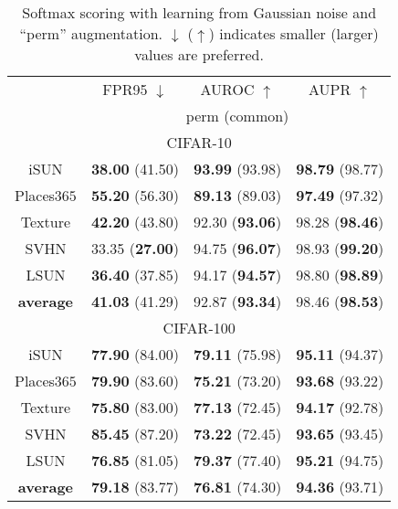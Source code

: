 \documentclass{article}
\begin{document}
\begin{table}[t]
\parbox{.47\linewidth}{
\centering
\caption{{Softmax scoring with learning from Gaussian noise and ``perm'' augmentation. $\downarrow$ ($\uparrow$) indicates smaller (larger) values are preferred.}} \label{tab: softmax perm}
\vspace{5pt}
\scriptsize
{
\begin{tabular}{c|ccc}
\toprule[1.5pt]
                   & FPR95 $\downarrow$     & AUROC $\uparrow$       & AUPR $\uparrow$      \\
                   \cline{2-4} 
\multirow{-2}{*}{} & \multicolumn{3}{c}{perm (common)} \\
\midrule[0.6pt]
\multicolumn{4}{c}{\cellcolor{greyL}CIFAR-10} \\
\midrule[0.6pt]
iSUN               & \textbf{38.00} (41.50) & \textbf{93.99} (93.98) & \textbf{98.79} (98.77) \\ 
Places$365$        & \textbf{55.20} (56.30) & \textbf{89.13} (89.03) & \textbf{97.49} (97.32) \\
Texture            & \textbf{42.20} (43.80) & 92.30 (\textbf{93.06}) & 98.28 (\textbf{98.46}) \\
SVHN               & 33.35 (\textbf{27.00}) & 94.75 (\textbf{96.07}) & {98.93} (\textbf{99.20}) \\
LSUN               & \textbf{36.40} (37.85) & 94.17 (\textbf{94.57}) & 98.80 (\textbf{98.89}) \\
\midrule
\textbf{average}   & \textbf{41.03} (41.29) & {92.87} (\textbf{93.34}) & {98.46} (\textbf{98.53}) \\ \midrule[1pt]
\multicolumn{4}{c}{\cellcolor{greyL}CIFAR-100} \\
\midrule[1pt]
iSUN               & \textbf{77.90} (84.00) & \textbf{79.11} (75.98) & \textbf{95.11} (94.37) \\ 
Places$365$        & \textbf{79.90} (83.60) & \textbf{75.21} (73.20) & \textbf{93.68} (93.22) \\
Texture            & \textbf{75.80} (83.00) & \textbf{77.13} (72.45) & \textbf{94.17} (92.78) \\
SVHN               & \textbf{85.45} (87.20) & \textbf{73.22} (72.45) & \textbf{93.65} (93.45) \\
LSUN               & \textbf{76.85} (81.05) & \textbf{79.37} (77.40) & \textbf{95.21} (94.75) \\
\midrule
\textbf{average}   & \textbf{79.18} (83.77) & \textbf{76.81} (74.30) & \textbf{94.36} (93.71) \\ \bottomrule[1.5pt]      

\end{tabular}}}
\end{table}
\end{document}

